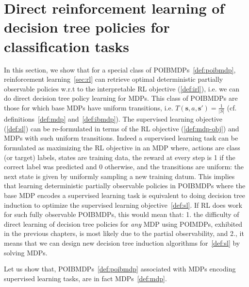 \chapter{Direct reinforcement learning of decision tree policies for classification tasks}\label{sec:pomdp-classif}
In this section, we show that for a special class of POIBMDPs~\ref{def:poibmdp}, reinforcement learning~\ref{sec:rl} can retrieve optimal deterministic partially observable policies w.r.t to the interpretable RL objective (\ref{def:irl}), i.e. we can do direct decision tree policy learning for MDPs.
This class of POIBMDPs are those for which base MDPs have uniform transitions, i.e. $T(\boldsymbol{s}, a, \boldsymbol{s}') = \frac{1}{|S|}$ (cf. definitions~\ref{def:mdp} and~\ref{def:ibmdp}).
The supervised learning objective (\ref{def:sl}) can be re-formulated in terms of the RL objective (\ref{def:mdp-obj}) and MDPs with such uniform transitions.
Indeed a supervised learning task can be formulated as maximizing the RL objective in an MDP where, actions are class (or target) labels, states are training data, the reward at every step is 1 if the correct label was predicted and 0 otherwise, and the transitions are uniform: the next state is given by uniformly sampling a new training datum. 
This implies that learning deterministic partially observable policies in POIBMDPs where the base MDP encodes a supervised learning task is equivalent to doing decision tree induction to optimize the supervised learning objective~\ref{def:sl}.
If RL does work for such fully observable POIBMDPs, this would mean that: 1. the difficulty of direct learning of decision tree policies for \textit{any} MDP using POIMDPs, exhibited in the previous chapters, is most likely due to the partial observability, and 2., it means that we can design new decision tree induction algorithms for~\ref{def:sl} by solving MDPs.

Let us show that, POIBMDPs~\ref{def:poibmdp} associated with MDPs encoding supervised learning tasks, are in fact MDPs~\ref{def:mdp}.

